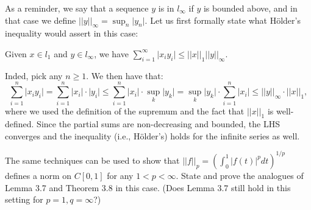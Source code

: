 \begin{solution}
    
    As a reminder, we say that a sequence $y$ is in $l_{\infty}$ if $y$ is bounded above, and in that case we define $\lvert \lvert y \rvert \rvert_{\infty} = \sup_{n} \lvert y_n \rvert$. 
    Let us first formally state what Hölder's inequality would assert in this case:

    Given $x \in l_1$ and $y \in l_{\infty}$, we have $\sum_{i=1}^{\infty} \lvert x_i y_i \rvert \leq \lvert \lvert x \rvert \rvert_1 \lvert \lvert y \rvert \rvert_{\infty}$.

    Inded, pick any $n \geq 1$.
    We then have that:
    $$\sum_{i=1}^{n} \lvert x_i y_i \rvert = \sum_{i=1}^{n} \lvert x_i \rvert \cdot \lvert y_i \rvert \leq \sum_{i=1}^{n} \lvert x_i \rvert \cdot \sup_{k} \lvert y_k \rvert = \sup_{k} \lvert y_k \rvert \cdot \sum_{i=1}^{n} \lvert x_i \rvert \leq \lvert \lvert y \rvert \rvert_{\infty} \cdot \lvert \lvert x \rvert \rvert_1,$$
    where we used the definition of the supremum and the fact that $\lvert \lvert x \rvert \rvert_1$ is well-defined.
    Since the partial sums are non-decreasing and bounded, the LHS converges and the inequality (i.e., Hölder's) holds for the infinite series as well.
\end{solution}

\begin{exercise}{25}
    The same techniques can be used to show that $\lvert \lvert f \rvert \rvert_p = (\int_{0}^{1} \lvert f(t) \rvert^p dt)^{1/p}$ defines a norm on $C[0, 1]$ for any $1 < p < \infty$.
    State and prove the analogues of Lemma 3.7 and Theorem 3.8 in this case.
    (Does Lemma 3.7 still hold in this setting for $p = 1, q = \infty$?)
\end{exercise}

